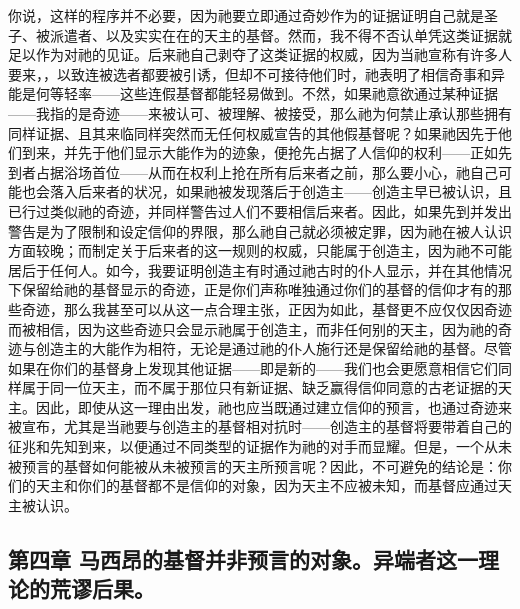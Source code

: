 你说，这样的程序并不必要，因为祂要立即通过奇妙作为的证据证明自己就是圣子、被派遣者、以及实实在在的天主的基督。然而，我不得不否认单凭这类证据就足以作为对祂的见证。后来祂自己剥夺了这类证据的权威，因为当祂宣称有许多人要来，，以致连被选者都要被引诱，但却不可接待他们时，祂表明了相信奇事和异能是何等轻率——这些连假基督都能轻易做到。不然，如果祂意欲通过某种证据——我指的是奇迹——来被认可、被理解、被接受，那么祂为何禁止承认那些拥有同样证据、且其来临同样突然而无任何权威宣告的其他假基督呢？如果祂因先于他们到来，并先于他们显示大能作为的迹象，便抢先占据了人信仰的权利——正如先到者占据浴场首位——从而在权利上抢在所有后来者之前，那么要小心，祂自己可能也会落入后来者的状况，如果祂被发现落后于创造主——创造主早已被认识，且已行过类似祂的奇迹，并同样警告过人们不要相信后来者。因此，如果先到并发出警告是为了限制和设定信仰的界限，那么祂自己就必须被定罪，因为祂在被人认识方面较晚；而制定关于后来者的这一规则的权威，只能属于创造主，因为祂不可能居后于任何人。如今，我要证明创造主有时通过祂古时的仆人显示，并在其他情况下保留给祂的基督显示的奇迹，正是你们声称唯独通过你们的基督的信仰才有的那些奇迹，那么我甚至可以从这一点合理主张，正因为如此，基督更不应仅仅因奇迹而被相信，因为这些奇迹只会显示祂属于创造主，而非任何别的天主，因为祂的奇迹与创造主的大能作为相符，无论是通过祂的仆人施行还是保留给祂的基督。尽管如果在你们的基督身上发现其他证据——即是新的——我们也会更愿意相信它们同样属于同一位天主，而不属于那位只有新证据、缺乏赢得信仰同意的古老证据的天主。因此，即使从这一理由出发，祂也应当既通过建立信仰的预言，也通过奇迹来被宣布，尤其是当祂要与创造主的基督相对抗时——创造主的基督将要带着自己的征兆和先知到来，以便通过不同类型的证据作为祂的对手而显耀。但是，一个从未被预言的基督如何能被从未被预言的天主所预言呢？因此，不可避免的结论是：你们的天主和你们的基督都不是信仰的对象，因为天主不应被未知，而基督应通过天主被认识。\par


\subsection{第四章 马西昂的基督并非预言的对象。异端者这一理论的荒谬后果。}

